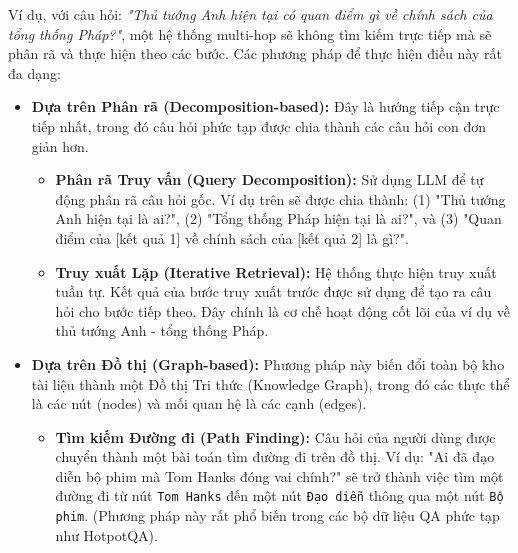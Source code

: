 \begin{itemize}
    Ví dụ, với câu hỏi: \textit{"Thủ tướng Anh hiện tại có quan điểm gì về chính sách của tổng thống Pháp?"}, một hệ thống multi-hop sẽ không tìm kiếm trực tiếp mà sẽ phân rã và thực hiện theo các bước. Các phương pháp để thực hiện điều này rất đa dạng:

    \begin{itemize}
        \item \textbf{Dựa trên Phân rã (Decomposition-based):} 
        Đây là hướng tiếp cận trực tiếp nhất, trong đó câu hỏi phức tạp được chia thành các câu hỏi con đơn giản hơn.
        \begin{itemize}
            \item \textbf{Phân rã Truy vấn (Query Decomposition):} 
            Sử dụng LLM để tự động phân rã câu hỏi gốc. Ví dụ trên sẽ được chia thành: (1) "Thủ tướng Anh hiện tại là ai?", (2) "Tổng thống Pháp hiện tại là ai?", và (3) "Quan điểm của [kết quả 1] về chính sách của [kết quả 2] là gì?".
            \item \textbf{Truy xuất Lặp (Iterative Retrieval):} 
            Hệ thống thực hiện truy xuất tuần tự. Kết quả của bước truy xuất trước được sử dụng để tạo ra câu hỏi cho bước tiếp theo. Đây chính là cơ chế hoạt động cốt lõi của ví dụ về thủ tướng Anh - tổng thống Pháp.
        \end{itemize}

        \item \textbf{Dựa trên Đồ thị (Graph-based):} 
        Phương pháp này biến đổi toàn bộ kho tài liệu thành một Đồ thị Tri thức (Knowledge Graph), trong đó các thực thể là các nút (nodes) và mối quan hệ là các cạnh (edges).
        \begin{itemize}
            \item \textbf{Tìm kiếm Đường đi (Path Finding):} 
            Câu hỏi của người dùng được chuyển thành một bài toán tìm đường đi trên đồ thị. Ví dụ: "Ai đã đạo diễn bộ phim mà Tom Hanks đóng vai chính?" sẽ trở thành việc tìm một đường đi từ nút \texttt{Tom Hanks} đến một nút \texttt{Đạo diễn} thông qua một nút \texttt{Bộ phim}. (Phương pháp này rất phổ biến trong các bộ dữ liệu QA phức tạp như HotpotQA).
        \end{itemize}


\end{itemize}
\end{itemize}
